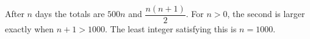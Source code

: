 After $n$ days the totals are $500n$ and $\dfrac{n(n+1)}{2}$. For $n>0$, the second is larger exactly when $n+1>1000$. The least integer satisfying this is $\boxed{n=1000}$.
